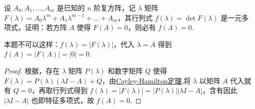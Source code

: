 \documentclass[../../main.tex]{subfiles}
\begin{document}
\begin{example}
设 $A_0,A_1,\dots,A_m$ 是已知的 $n$ 阶复方阵，记 $\lambda$ 矩阵 $F(\lambda)=A_0\lambda^m + A_1\lambda^{m - 1} + \dots + A_m$，其行列式 $f(\lambda)=\det F(\lambda)$ 是一元多项式，证明：若方阵 $A$ 使得 $F(A)=0$，则必有 $f(A)=0$.
\end{example}
\begin{remark}
本题不可以这样：$f(\lambda)=|F(\lambda)|$，代入 $\lambda = A$ 得到 $f(A)=|F(A)|=|0|=0$.
\end{remark}
\begin{proof}
根据，存在 $\lambda$ 矩阵 $P(\lambda)$ 和数字矩阵 $Q$ 使得 $F(\lambda)=P(\lambda)(\lambda I - A)+Q$，由\hyperref[theorem:Cayley-Hamilton定理]{Cayley-Hamilton定理},将 $\lambda$ 以矩阵 $A$ 代入就有 $Q = 0$，再取行列式得到 $f(\lambda)=|F(\lambda)|=|P(\lambda)||\lambda I - A|$，含有因此 $|\lambda I - A|$ 也即特征多项式，故 $f(A)=0.$
\end{proof}
\end{document}
